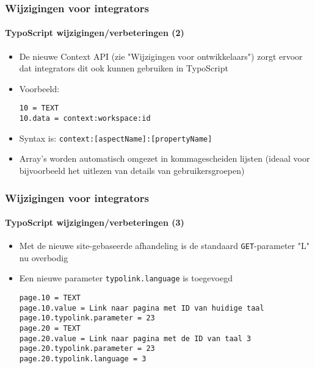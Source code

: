 \begin{frame}[fragile]
	\frametitle{Wijzigingen voor integrators}
	\framesubtitle{TypoScript wijzigingen/verbeteringen (2)}

	\lstset{basicstyle=\smaller\ttfamily}

	\begin{itemize}
		\item De nieuwe Context API (zie "Wijzigingen voor ontwikkelaars")
			zorgt ervoor dat integrators dit ook kunnen gebruiken in TypoScript

		\item Voorbeeld:

			\begin{lstlisting}
10 = TEXT
10.data = context:workspace:id
			\end{lstlisting}

		\item Syntax is: \texttt{context:[aspectName]:[propertyName]}

		\item Array's worden automatisch omgezet in kommagescheiden lijsten\newline
			\smaller(ideaal voor bijvoorbeeld het uitlezen van details van gebruikersgroepen)\normalsize

	\end{itemize}

\end{frame}


\begin{frame}[fragile]
	\frametitle{Wijzigingen voor integrators}
	\framesubtitle{TypoScript wijzigingen/verbeteringen (3)}

	\lstset{basicstyle=\smaller\ttfamily}

	\begin{itemize}
		\item Met de nieuwe site-gebaseerde afhandeling is de standaard \texttt{GET}-parameter
			"L" nu overbodig
		\item Een nieuwe parameter \texttt{typolink.language} is toegevoegd

			\begin{lstlisting}
page.10 = TEXT
page.10.value = Link naar pagina met ID van huidige taal
page.10.typolink.parameter = 23
page.20 = TEXT
page.20.value = Link naar pagina met de ID van taal 3
page.20.typolink.parameter = 23
page.20.typolink.language = 3
			\end{lstlisting}

	\end{itemize}

\end{frame}

